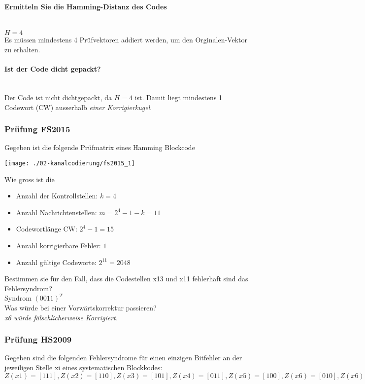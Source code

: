 \paragraph{Ermitteln Sie die Hamming-Distanz des Codes}\mbox{}\\
$H=4$\\
Es müssen mindestens 4 Prüfvektoren addiert werden, um den Orginalen-Vektor zu erhalten.

\paragraph{Ist der Code dicht gepackt?}\mbox{}\\
Der Code ist nicht dichtgepackt, da $H=4$ ist. Damit liegt mindestens 1 Codewort (CW) ausserhalb \textit{einer Korrigierkugel}.

\subsubsection{Prüfung FS2015}
Gegeben ist die folgende Prüfmatrix eines  Hamming Blockcode
\begin{center}
    \vspace{-8pt}
    \texttt{[image: ./02-kanalcodierung/fs2015\_1]}
    \vspace{-8pt}
\end{center}

Wie gross ist die
\begin{itemize}
    \item Anzahl der Kontrollstellen: $k=4$
    \item Anzahl Nachrichtenstellen: $m=2^4-1-k=11$
    \item Codewortlänge CW: $2^4-1=15$
    \item Anzahl korrigierbare Fehler: $1$
    \item Anzahl gültige Codeworte: $2^11=2048$\\
\end{itemize}

Bestimmen sie für den Fall, dass die Codestellen x13 und x11 fehlerhaft sind das Fehlersyndrom?\\
Syndrom $(0011)^T$\\

Was würde bei einer Vorwärtskorrektur passieren?\\
\textit{x6 würde fälschlicherweise Korrigiert.}

\subsubsection{Prüfung HS2009}
Gegeben sind die folgenden Fehlersyndrome für einen einzigen Bitfehler an der jeweiligen Stelle xi eines systematischen Blockkodes:\\
$Z(x1)=[111], Z(x2)=[110], Z(x3)=[101], Z(x4)=[011], Z(x5)=[100], Z(x6)=[010], Z(x6)=[001]$\\

